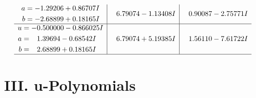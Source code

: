 \documentclass[1p]{elsarticle_modified}
\theoremstyle{definition}
\begin{document}
$$\begin{array}{c|c|c}
\begin{aligned}
a &= -1.29206 + 0.86707 I \\
b &= -2.68899 + 0.18165 I\end{aligned}
 & \phantom{-}6.79074 - 1.13408 I & \phantom{-}0.90087 - 2.75771 I \\ \hline\begin{aligned}
u &= -0.500000 - 0.866025 I \\
a &= \phantom{-}1.39694 - 0.68542 I \\
b &= \phantom{-}2.68899 + 0.18165 I\end{aligned}
 & \phantom{-}6.79074 + 5.19385 I & \phantom{-}1.56110 - 7.61722 I\\
 \hline 
 \end{array}$$\newpage
\newpage\renewcommand{\arraystretch}{1}
\centering \section*{ III. u-Polynomials}
\end{document}
